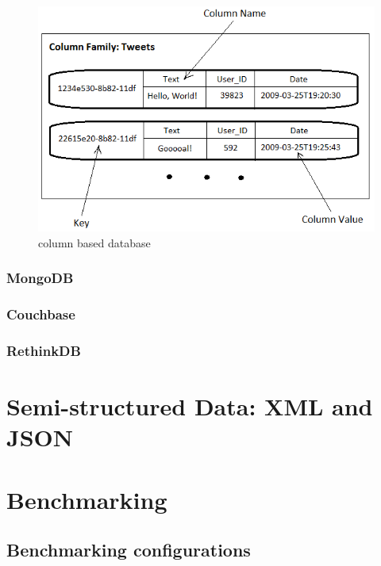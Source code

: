 \documentclass[a4paper,12pt]{book}
\begin{document}
\begin{description}
\end{description}
	
\begin{figure}[h]
	\centering
	\includegraphics[width=.8\textwidth]{img/column-family}
	\caption{column based database~\cite{wuoverview}}
	\label{fig:column-family-2}
	
	
\end{figure}

    \subsection{MongoDB}\label{nosql-mongodb}
	    
	\subsection{Couchbase}\label{intro-couchbase}
	    
	\subsection{RethinkDB}
        			
		
	\chapter{Semi-structured Data: XML and JSON}\label{semi-structure-data}
		
		
	\chapter{Benchmarking}\label{ch:benchmarking} %
	\section{Benchmarking configurations}
	
\end{document}
